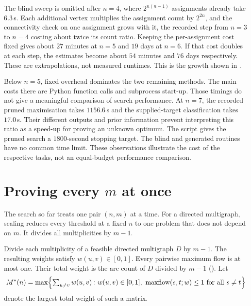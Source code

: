 The blind sweep is omitted after $n=4$, where $2^{n(n-1)}$ assignments already take $6.3$\,s.
Each additional vertex multiplies the assignment count by $2^{2n}$, and the
connectivity check on one assignment grows with it, the recorded step from
$n=3$ to $n=4$ costing about twice its count ratio.
Keeping the per-assignment cost fixed gives about $27$ minutes at $n=5$
and $19$ days at $n=6$. If that cost doubles at each step, the estimates
become about $54$ minutes and $76$ days respectively. These are extrapolations,
not measured runtimes.
This is the growth shown in .

Below $n=5$, fixed overhead dominates the two remaining methods.
The main costs there are Python function calls and subprocess start-up.
Those timings do not give a meaningful comparison of search performance.
At $n=7$, the recorded pruned maximisation takes $1156.6$\,s and the supplied-target classification takes $17.0$\,s. Their different outputs and prior information prevent interpreting this ratio as a speed-up for proving an unknown optimum. The script gives the pruned search a $1800$-second stopping target. The blind and generated routines have no common time limit. These observations illustrate the cost of the respective tasks, not an equal-budget performance comparison.

\begin{table}[ht]
    \centering
    \small
    
    \caption{Timings for different tasks: blind maximisation, construction-seeded pruned maximisation and \texttt{geng}-based classification at a supplied target. Only the first two independently bound the optimum from above. A dash means not attempted. These are separate runs from , whose recorded times differ. The table is not evidence of a like-for-like speed-up.}
    \label{tab:generating-benchmark}
\end{table}
\section{Proving every \texorpdfstring{$m$}{m} at once}\label{sec:prove-every-m}

The search so far treats one pair $(n,m)$ at a time.
For a directed multigraph, scaling reduces every threshold at a fixed $n$ to one problem that does not depend on $m$.
It divides all multiplicities by $m-1$.

Divide each multiplicity of a feasible directed multigraph $D$ by $m-1$.
The resulting weights satisfy $w(u,v)\in[0,1]$.
Every pairwise maximum flow is at most one.
Their total weight is the arc count of $D$ divided by $m-1$ ().
Let
\[
    M^{*}(n) = \max\Bigl\{\textstyle\sum_{u \ne v} w(u, v) : w(u,v) \in [0,1], \ \mathrm{maxflow}(s, t; w) \le 1 \ \text{for all } s \ne t\Bigr\}
\]
denote the largest total weight of such a matrix.

